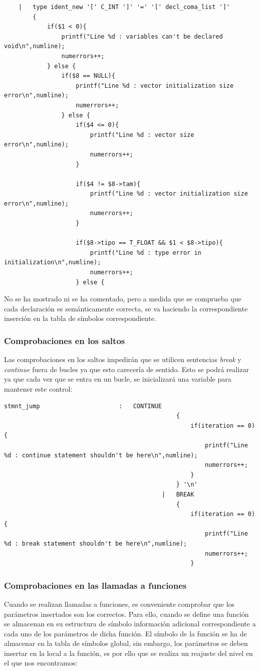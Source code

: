 \documentclass[a4paper,10pt]{article}
\begin{document}
\begin{lstlisting}
	|	type ident_new '[' C_INT ']' '=' '[' decl_coma_list ']' 
		{
			if($1 < 0){
				printf("Line %d : variables can't be declared void\n",numline);
				numerrors++;
			} else {
				if($8 == NULL){
					printf("Line %d : vector initialization size error\n",numline);
					numerrors++;
				} else {
					if($4 <= 0){
						printf("Line %d : vector size error\n",numline);
						numerrors++;
					}
					
					if($4 != $8->tam){
						printf("Line %d : vector initialization size error\n",numline);
						numerrors++;
					}
					
					if($8->tipo == T_FLOAT && $1 < $8->tipo){
						printf("Line %d : type error in initialization\n",numline);
						numerrors++;
					} else {
\end{lstlisting}

No se ha mostrado ni se ha comentado, pero a medida que se comprueba que cada declaración es semánticamente correcta, se va haciendo la correspondiente inserción en la tabla de símbolos correspondiente. 
\subsubsection{Comprobaciones en los saltos}

Las comprobaciones en los saltos impedirán que se utilicen sentencias \textit{break} y \textit{continue} fuera de bucles ya que esto carecería de sentido. Esto se podrá realizar ya que cada vez que se entra en un bucle, se inicializará una variable para mantener este control:

\begin{lstlisting}
stmnt_jump						:	CONTINUE 
												{
													if(iteration == 0){
														printf("Line %d : continue statement shouldn't be here\n",numline);
														numerrors++;
													} 
												} '\n'
											|	BREAK 
												{
													if(iteration == 0){
														printf("Line %d : break statement shouldn't be here\n",numline);
														numerrors++;
													}
\end{lstlisting}
\subsubsection{Comprobaciones en las llamadas a funciones}

Cuando se realizan llamadas a funciones, es conveniente comprobar que los parámetros insertados son los correctos. Para ello, cuando se define una función se almacenan en su estructura de símbolo información adicional correspondiente a cada uno de los parámetros de dicha función. El símbolo de la función se ha de almacenar en la tabla de símbolos global, sin embargo, los parámetros se deben insertar en la local a la función, es por ello que se realiza un reajuste del nivel en el que nos encontramos:
\end{document}
